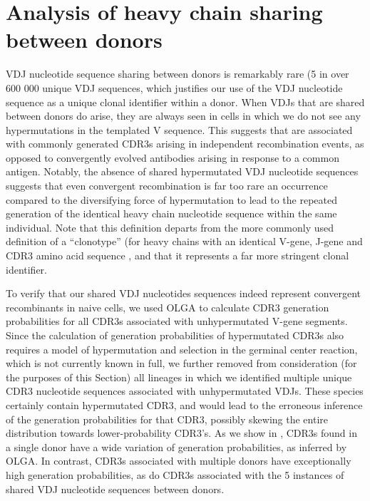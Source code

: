 \section{Analysis of heavy chain sharing between donors}
\noindent VDJ nucleotide sequence sharing between donors is remarkably rare (5 in over 600 000 unique VDJ sequences, which justifies our use of the VDJ nucleotide sequence as a unique clonal identifier within a donor. When VDJs that are shared between donors do arise, they are always seen in cells in which we do not see any hypermutations in the templated V sequence. This suggests that are associated with commonly generated CDR3s arising in independent recombination events, as opposed to convergently evolved antibodies arising in response to a common antigen. Notably, the absence of shared  hypermutated VDJ nucleotide sequences suggests that even convergent recombination is far too rare an occurrence compared to the diversifying force of hypermutation to lead to the repeated generation of the identical heavy chain nucleotide sequence within the same individual. Note that this definition departs from the more commonly used definition of a ``clonotype'' (for heavy chains with an identical V-gene, J-gene and CDR3 amino acid sequence \cite{soto2019high}, and that it represents a far more stringent clonal identifier.

To verify that our shared VDJ nucleotides sequences indeed represent convergent recombinants in naive cells, we used OLGA to calculate CDR3 generation probabilities for all CDR3s associated with unhypermutated V-gene segments\cite{sethna2019olga}. Since the calculation of generation probabilities of hypermutated CDR3s also requires a model of hypermutation and selection in the germinal center reaction, which is not currently known in full, we further removed from consideration (for the purposes of this Section) all lineages in which we identified multiple unique CDR3 nucleotide sequences associated with unhypermutated VDJs. These species certainly contain hypermutated CDR3, and would lead to the erroneous inference of the generation probabilities for that CDR3, possibly skewing the entire distribution towards lower-probability CDR3's. As we show in , CDR3s found in a single donor have a wide variation of generation probabilities, as inferred by OLGA. In contrast, CDR3s associated with multiple donors have exceptionally high generation probabilities, as do CDR3s associated with the 5 instances of shared VDJ nucleotide sequences between donors. 


